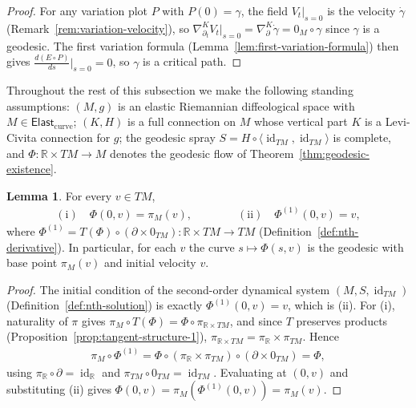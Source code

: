 \documentclass{amsart}
\newcommand{\R}{\mathbb{R}}
\DeclareMathOperator{\id}{id}
\theoremstyle{definition}
\newtheorem{lem}[thm]{Lemma}
\begin{document}
\begin{proof}
  For any variation plot $P$ with $P(0) = \gamma$, the field $V_t|_{s=0}$ is the
  velocity $\dot\gamma$ (Remark~\ref{rem:variation-velocity}), so
  $\nabla^{K}_{\partial_t} V_t|_{s=0} = \nabla^K_\partial \dot\gamma
  = 0_M \circ \gamma$ since $\gamma$ is a geodesic. The first variation formula
  (Lemma~\ref{lem:first-variation-formula}) then gives
  $\frac{d(E \circ P)}{ds}\big|_{s=0} = 0$, so $\gamma$ is a critical path.
\end{proof}

Throughout the rest of this subsection we make the following standing
assumptions: $(M, g)$ is an elastic Riemannian diffeological space with
$M \in \mathsf{Elast}_{\mathrm{curve}}$; $(K, H)$ is a full connection on $M$
whose vertical part $K$ is a Levi-Civita connection for $g$; the geodesic
spray $S = H \circ \langle \id_{TM}, \id_{TM} \rangle$ is complete, and
$\Phi \colon \R \times TM \to M$ denotes the geodesic flow of
Theorem~\ref{thm:geodesic-existence}.

\begin{lem}\label{lem:flow-initial}
  For every $v \in TM$,
  \begin{align*}
    \mathrm{(i)}\quad \Phi(0, v) = \pi_M(v),
    \qquad\qquad
    \mathrm{(ii)}\quad \Phi^{(1)}(0, v) = v,
  \end{align*}
  where
  $\Phi^{(1)} = T(\Phi) \circ (\partial \times 0_{TM}) \colon \R \times TM \to TM$
  (Definition~\ref{def:nth-derivative}). In particular, for each $v$ the curve
  $s \mapsto \Phi(s, v)$ is the geodesic with base point $\pi_M(v)$ and initial
  velocity $v$.
\end{lem}

\begin{proof}
  The initial condition of the second-order dynamical system
  $(M, S, \id_{TM})$ (Definition~\ref{def:nth-solution}) is exactly
  $\Phi^{(1)}(0, v) = v$, which is (ii). For (i),
  naturality of $\pi$ gives
  $\pi_M \circ T(\Phi) = \Phi \circ \pi_{\R \times TM}$, and since $T$ preserves
  products (Proposition~\ref{prop:tangent-structure-1}),
  $\pi_{\R \times TM} = \pi_\R \times \pi_{TM}$. Hence
  \begin{align*}
    \pi_M \circ \Phi^{(1)}
      = \Phi \circ (\pi_\R \times \pi_{TM}) \circ (\partial \times 0_{TM})
      = \Phi,
  \end{align*}
  using $\pi_\R \circ \partial = \id_\R$ and
  $\pi_{TM} \circ 0_{TM} = \id_{TM}$. Evaluating at $(0, v)$ and
  substituting (ii) gives $\Phi(0, v) = \pi_M(\Phi^{(1)}(0, v)) = \pi_M(v)$.
\end{proof}
\end{document}
